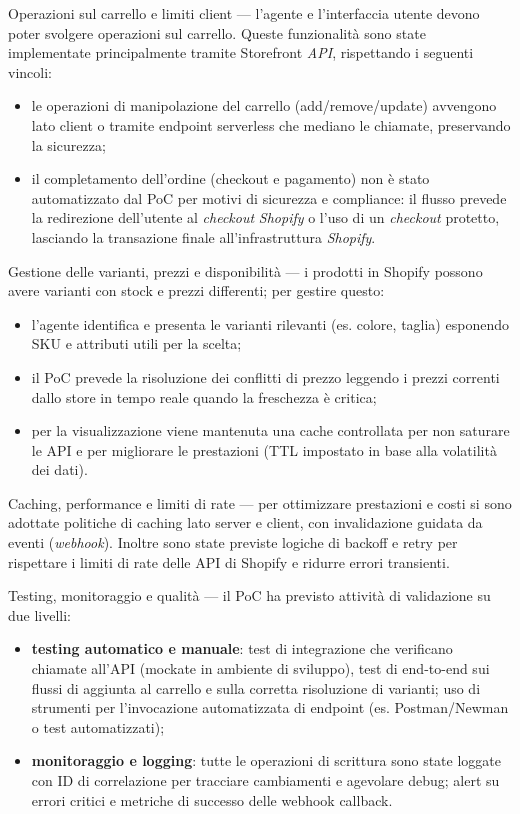 Operazioni sul carrello e limiti client — l'agente e l'interfaccia utente devono poter svolgere operazioni sul carrello. Queste funzionalità sono state implementate 
principalmente tramite Storefront \emph{API}, rispettando i seguenti vincoli:
\begin{itemize}
\item le operazioni di manipolazione del carrello (add/remove/update) avvengono lato client o tramite endpoint serverless che mediano le chiamate, preservando la sicurezza;
\item il completamento dell'ordine (checkout e pagamento) non è stato automatizzato dal PoC per motivi di sicurezza e compliance: il flusso prevede la redirezione dell'utente 
al \emph{checkout} \emph{Shopify} o l'uso di un \emph{checkout} protetto, lasciando la transazione finale all'infrastruttura \emph{Shopify}.
\end{itemize}

Gestione delle varianti, prezzi e disponibilità — i prodotti in Shopify possono avere varianti con stock e prezzi differenti; per gestire questo:
\begin{itemize}
\item l'agente identifica e presenta le varianti rilevanti (es. colore, taglia) esponendo SKU e attributi utili per la scelta;
\item il PoC prevede la risoluzione dei conflitti di prezzo leggendo i prezzi correnti dallo store in tempo reale quando la freschezza è critica;
\item per la visualizzazione viene mantenuta una cache controllata per non saturare le API e per migliorare le prestazioni (TTL impostato in base alla volatilità dei dati).
\end{itemize}

Caching, performance e limiti di rate — per ottimizzare prestazioni e costi si sono adottate politiche di caching lato server e client, con invalidazione guidata da eventi (\emph{webhook}). 
Inoltre sono state previste logiche di backoff e retry per rispettare i limiti di rate delle API di Shopify e ridurre errori transienti.

Testing, monitoraggio e qualità — il PoC ha previsto attività di validazione su due livelli:
\begin{itemize}
\item \textbf{testing automatico e manuale}: test di integrazione che verificano chiamate all'API (mockate in ambiente di sviluppo),
 test di end-to-end sui flussi di aggiunta al carrello e sulla corretta risoluzione di varianti; uso di strumenti per l'invocazione automatizzata di endpoint 
 (es. Postman/Newman o test automatizzati);
\item \textbf{monitoraggio e logging}: tutte le operazioni di scrittura sono state loggate con ID di correlazione per tracciare cambiamenti e agevolare debug; 
alert su errori critici e metriche di successo delle webhook callback.
\end{itemize}

